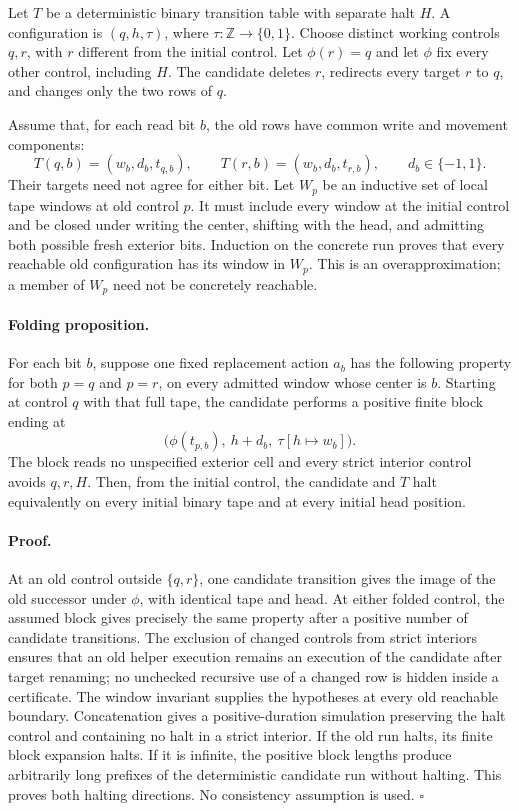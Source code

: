 Let $T$ be a deterministic binary transition table with separate halt $H$. A configuration is $(q,h,\tau)$, where $\tau:\mathbb Z\to\{0,1\}$. Choose distinct working controls $q,r$, with $r$ different from the initial control. Let $\phi(r)=q$ and let $\phi$ fix every other control, including $H$. The candidate deletes $r$, redirects every target $r$ to $q$, and changes only the two rows of $q$.

Assume that, for each read bit $b$, the old rows have common write and movement components:
\[
 T(q,b)=(w_b,d_b,t_{q,b}),\qquad
 T(r,b)=(w_b,d_b,t_{r,b}),\qquad d_b\in\{-1,1\}.
\]
Their targets need not agree for either bit. Let $W_p$ be an inductive set of local tape windows at old control $p$. It must include every window at the initial control and be closed under writing the center, shifting with the head, and admitting both possible fresh exterior bits. Induction on the concrete run proves that every reachable old configuration has its window in $W_p$. This is an overapproximation; a member of $W_p$ need not be concretely reachable.

\paragraph{Folding proposition.}
For each bit $b$, suppose one fixed replacement action $a_b$ has the following property for both $p=q$ and $p=r$, on every admitted window whose center is $b$. Starting at control $q$ with that full tape, the candidate performs a positive finite block ending at
\[
 \bigl(\phi(t_{p,b}),\ h+d_b,\ \tau[h\mapsto w_b]\bigr).
\]
The block reads no unspecified exterior cell and every strict interior control avoids $q,r,H$. Then, from the initial control, the candidate and $T$ halt equivalently on every initial binary tape and at every initial head position.

\paragraph{Proof.}
At an old control outside $\{q,r\}$, one candidate transition gives the image of the old successor under $\phi$, with identical tape and head. At either folded control, the assumed block gives precisely the same property after a positive number of candidate transitions. The exclusion of changed controls from strict interiors ensures that an old helper execution remains an execution of the candidate after target renaming; no unchecked recursive use of a changed row is hidden inside a certificate. The window invariant supplies the hypotheses at every old reachable boundary. Concatenation gives a positive-duration simulation preserving the halt control and containing no halt in a strict interior. If the old run halts, its finite block expansion halts. If it is infinite, the positive block lengths produce arbitrarily long prefixes of the deterministic candidate run without halting. This proves both halting directions. No consistency assumption is used. \hfill$\square$


